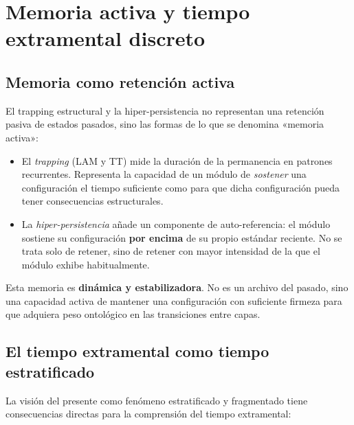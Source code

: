 \section{Memoria activa y tiempo extramental discreto}

\subsection{Memoria como retención activa}

El trapping estructural y la hiper-persistencia no representan una retención pasiva de estados pasados, sino las formas de lo que se denomina «memoria activa»:

\begin{itemize}
    \item El \textit{trapping} (LAM y TT) mide la duración de la permanencia en patrones recurrentes. Representa la capacidad de un módulo de \textit{sostener} una configuración el tiempo suficiente como para que dicha configuración pueda tener consecuencias estructurales.
    \item La \textit{hiper-persistencia} añade un componente de auto-referencia: el módulo sostiene su configuración \textbf{por encima} de su propio estándar reciente. No se trata solo de retener, sino de retener con mayor intensidad de la que el módulo exhibe habitualmente.
\end{itemize}

Esta memoria es \textbf{dinámica y estabilizadora}. No es un archivo del pasado, sino una capacidad activa de mantener una configuración con suficiente firmeza para que adquiera peso ontológico en las transiciones entre capas.

\subsection{El tiempo extramental como tiempo estratificado}

La visión del presente como fenómeno estratificado y fragmentado tiene consecuencias directas para la comprensión del tiempo extramental:

